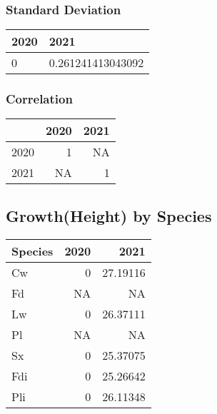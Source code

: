 \documentclass[
]{article}
\begin{document}
\hypertarget{standard-deviation-1}{%
\subsubsection{Standard Deviation}\label{standard-deviation-1}}

\begin{table}[H]
\centering
\begin{tabular}{l|l}
\hline
2020 & 2021\\
\hline
0 & 0.261241413043092\\
\hline
\end{tabular}
\end{table}

\hypertarget{correlation-1}{%
\subsubsection{Correlation}\label{correlation-1}}

\begin{table}[H]
\centering
\begin{tabular}{l|r|r}
\hline
  & 2020 & 2021\\
\hline
2020 & 1 & NA\\
\hline
2021 & NA & 1\\
\hline
\end{tabular}
\end{table}

\hypertarget{growthheight-by-species}{%
\subsection{Growth(Height) by Species}\label{growthheight-by-species}}

\begin{table}[H]
\centering
\begin{tabular}{l|r|r}
\hline
Species & 2020 & 2021\\
\hline
Cw & 0 & 27.19116\\
\hline
Fd & NA & NA\\
\hline
Lw & 0 & 26.37111\\
\hline
Pl & NA & NA\\
\hline
Sx & 0 & 25.37075\\
\hline
Fdi & 0 & 25.26642\\
\hline
Pli & 0 & 26.11348\\
\hline
\end{tabular}
\end{table}
\end{document}
